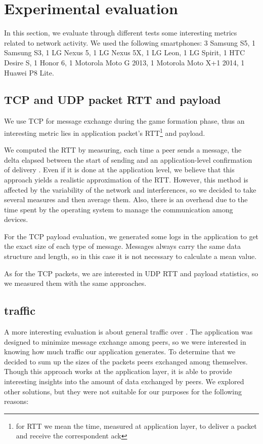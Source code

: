 \section{Experimental evaluation}

In this section, we evaluate through different tests some interesting metrics
related to network activity. We used the following smartphones: 3 Samsung S5,
1 Samsung S3, 1 LG Nexus 5, 1 LG Nexus 5X, 1 LG Leon, 1 LG Spirit, 1 HTC Desire
S, 1 Honor 6, 1 Motorola Moto G 2013, 1 Motorola Moto X+1 2014, 1 Huawei P8
Lite.

\subsection{TCP and UDP packet RTT and payload}
We use TCP for message exchange during the game formation phase, thus an interesting metric lies in application packet's RTT\footnote{for RTT we mean the time, measured at application layer, to deliver a packet and receive the correspondent ack} and payload.

We computed the RTT by measuring, each time a peer sends a message, the delta
elapsed between the start of sending and an application-level confirmation of
delivery . Even if it is done at the application level, we believe that this
approach yields a realistic approximation of the RTT.
However, this method is affected by the variability of the network and
interferences, so we decided to take several measures and then average them.
Also, there is an overhead due to the time spent by the operating system to
manage the communication among devices.

For the TCP payload evaluation, we generated some logs in the application to get the exact size of each type of message. Messages always carry the same data structure and length, so in this case it is not necessary to calculate a mean value.

As for the TCP packets, we are interested in UDP RTT and payload statistics, so we measured them with the same approaches.

\subsection{\wifi{} traffic}

A more interesting evaluation is about general traffic over \wifi. The
application was designed to minimize message exchange among peers, so we were
interested in knowing how much traffic our application generates. To determine
that we decided to sum up the sizes of the packets peers exchanged among
themselves.
Though this approach works at the application layer, it is able to provide
interesting insights into the amount of data exchanged by peers. We explored
other solutions, but they were not suitable for our purposes for the following
reasons:

